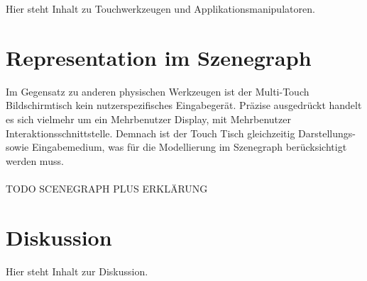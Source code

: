 Hier steht Inhalt zu Touchwerkzeugen und Applikationsmanipulatoren.


\section{Representation im Szenegraph}
\label{sec:representation_im_szenegraph}

Im Gegensatz zu anderen physischen Werkzeugen ist der Multi-Touch Bildschirmtisch kein nutzerspezifisches Eingabegerät. Präzise ausgedrückt handelt es sich vielmehr um ein Mehrbenutzer Display, mit Mehrbenutzer Interaktionsschnittstelle. Demnach ist der Touch Tisch gleichzeitig Darstellungs- sowie Eingabemedium, was für die Modellierung im Szenegraph berücksichtigt werden muss. 
\\\\
TODO SCENEGRAPH PLUS ERKLÄRUNG



\section{Diskussion}
\label{sec:diskussion_applikationsstruktur}

Hier steht Inhalt zur Diskussion.